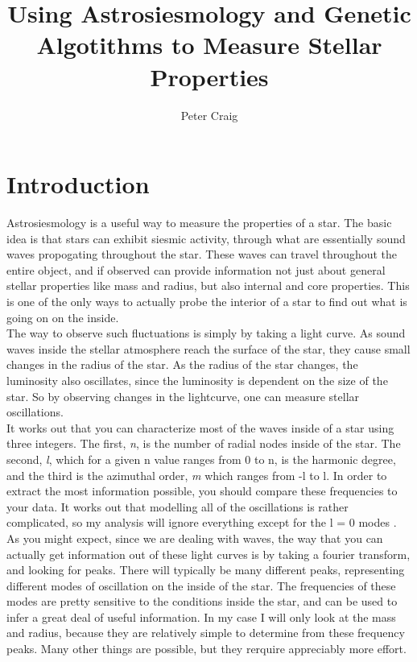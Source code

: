 \documentclass[twocolumn]{aastex63}
\begin{document}
\title{Using Astrosiesmology and Genetic Algotithms to Measure Stellar Properties}
\author{Peter Craig}
\section{Introduction}

Astrosiesmology is a useful way to measure the properties of a star. The basic idea is that stars can exhibit siesmic activity, through what are essentially sound waves propogating throughout the star. These waves can travel throughout the entire object, and if observed can provide information not just about general stellar properties like mass and radius, but also internal and core properties. This is one of the only ways to actually probe the interior of a star to find out what is going on on the inside.\\

The way to observe such fluctuations is simply by taking a light curve. As sound waves inside the stellar atmosphere reach the surface of the star, they cause small changes in the radius of the star. As the radius of the star changes, the luminosity also oscillates, since the luminosity is dependent on the size of the star. So by observing changes in the lightcurve, one can measure stellar oscillations.\\

It works out that you can characterize most of the waves inside of a star using three integers. The first, \textit{n}, is the number of radial nodes inside of the star. The second,  \textit{l}, which for a given n value ranges from 0 to n, is the harmonic degree, and the third is the azimuthal order,  \textit{m} which ranges from -l to l. In order to extract the most information possible, you should compare these frequencies to your data. It works out that modelling all of the oscillations is rather complicated, so my analysis will ignore everything except for the l = 0 modes \citep{review}.\\

As you might expect, since we are dealing with waves, the way that you can actually get information out of these light curves is by taking a fourier transform, and looking for peaks. There will typically be many different peaks, representing different modes of oscillation on the inside of the star. The frequencies of these modes are pretty sensitive to the conditions inside the star, and can be used to infer a great deal of useful information. In my case I will only look at the mass and radius, because they are relatively simple to determine from these frequency peaks. Many other things are possible, but they rerquire appreciably more effort.\\
\end{document}
